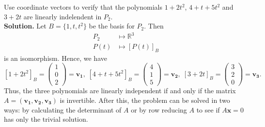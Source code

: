 \documentclass[10pt, a4paper]{article}
\newcommand{\R}{\mathbb{R}}
\newcommand{\vt}[1]{\mathbf{#1}}
\begin{document}
\begin{example}
    Use coordinate vectors to verify that the polynomials $1+2t^2$, $4+t+5t^2$ and $3+2t$ are linearly indelendent in $P_2$.\\
    \textbf{Solution.} Let $B=\{1, t, t^2\}$ be the basis for $P_2$. Then\begin{align*}
        P_2 & \mapsto \R^3\\
        P(t) & \mapsto [P(t)]_B
    \end{align*}
    is an isomorphism. Hence, we have \[
    [1+2t^2]_B = \begin{pmatrix}
        1\\0\\2
    \end{pmatrix} = \vt{v_1},\; 
    [4+t+5t^2]_B = \begin{pmatrix}
        4\\1\\5
    \end{pmatrix} = \vt{v_2},\; 
    [3+2t]_B = \begin{pmatrix}
        3\\2\\0
    \end{pmatrix} = \vt{v_3}.
    \]
    Thus, the three polynomials are linearly independent if and only if the matrix $A = (\vt{v_1}, \vt{v_2}, \vt{v_3})$ is invertible.
    After this, the problem can be solved in two ways: by calculating the determinant of $A$ or by row reducing $A$ to see if $A\vt{x}=0$ has only the trivial solution.
\end{example}
\end{document}
